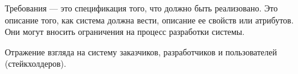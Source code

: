 
\usepackage{pgfplots}
\pgfplotsset{compat=1.9}


    \Header

    \BeginConspect



    \begin{Def}[Требования]
        Требования --- это спецификация того, что должно быть реализовано. Это описание того, как система должна вести, описание ее свойств или атрибутов. Они могут вносить ограничения на процесс разработки системы.
    \end{Def}
    
    \begin{Rem}
        Отражение взгляда на систему заказчиков, разработчиков и пользователей (стейкхолдеров).
    \end{Rem}


